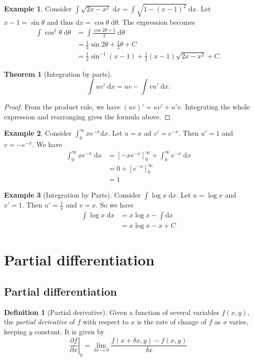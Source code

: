 \documentclass[a4paper]{article}
\theoremstyle{definition}
\newtheorem*{thm}{Theorem}
\newtheorem*{defi}{Definition}
\newtheorem*{eg}{Example}
\renewcommand{\d}{\mathrm{d}}
\let\stdsection\section
\renewcommand\section{\newpage\stdsection}
\begin{document}
\begin{eg}
  Consider $\int \sqrt{2x - x^2}\;\d x = \int\sqrt{1 - (x - 1)^2}\;\d x$. Let $x - 1=\sin\theta$ and thus $\d x = \cos \theta\;\d\theta$. The expression becomes
  \begin{align*}
    \int \cos^2\theta \;\d \theta &= \int\frac{\cos 2\theta + 1}{2}\;\d \theta\\
    &= \frac{1}{4}\sin 2\theta + \frac{1}{2}\theta + C\\
    &= \frac{1}{2}\sin^{-1}(x - 1) + \frac{1}{2}(x - 1)\sqrt{2x - x^2} + C.
  \end{align*}
\end{eg}

\begin{thm}[Integration by parts]
  \[
  \int uv'\;\d x = uv - \int vu' \;\d x.
  \]
\end{thm}

\begin{proof}
  From the product rule, we have $(uv)' = uv' + u'v$. Integrating the whole expression and rearranging gives the formula above.
\end{proof}

\begin{eg}
  Consider $\int_0^\infty xe^{-x}\d x$. Let $u = x$ ad $v' = e^{-x}$. Then $u' = 1$ and $v = -e^{-x}$. We have
  \begin{align*}
    \int_0^\infty xe^{-x}\;\d x &= [-xe^{-x}]^\infty_0 + \int_0^\infty e^{-x} \;\d x\\
    &= 0 + [e^{-x}]_0^\infty\\
    &= 1
  \end{align*}
\end{eg}

\begin{eg}[Integration by Parts]
  Consider $\int \log x\; \d x$. Let $u = \log x$ and $v' = 1$. Then $u' = \frac{1}{x}$ and $v = x$. So we have
  \begin{align*}
    \int \log x\; \d x &= x\log x - \int \d x\\
    &= x \log x - x + C
  \end{align*}
\end{eg}

\section{Partial differentiation}
\subsection{Partial differentiation}
\begin{defi}[Partial derivative]
  Given a function of several variables $f(x, y)$, the \emph{partial derivative} of $f$ with respect to $x$ is the rate of change of $f$ as $x$ varies, keeping $y$ constant. It is given by
  \[
  \left. \frac{\partial f}{\partial x}\right|_y = \lim_{\delta x\to 0} \frac{f(x + \delta x, y) - f(x, y)}{\delta x}
  \]
\end{defi}
\end{document}
